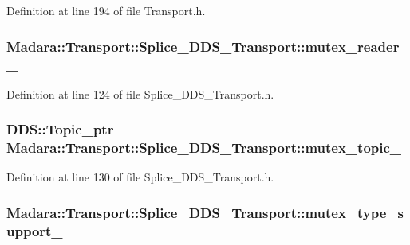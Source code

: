 Definition at line 194 of file Transport.h.

\hypertarget{classMadara_1_1Transport_1_1Splice__DDS__Transport_a977ec99be57aebd70c9ab6f9428144e0}{
\subsubsection[{mutex\_\-reader\_\-}]{ {\bf Madara::Transport::Splice\_\-DDS\_\-Transport::mutex\_\-reader\_\-}}}
\label{d0/d91/classMadara_1_1Transport_1_1Splice__DDS__Transport_a977ec99be57aebd70c9ab6f9428144e0}


Definition at line 124 of file Splice\_\-DDS\_\-Transport.h.

\hypertarget{classMadara_1_1Transport_1_1Splice__DDS__Transport_a6cb70c5b92c7849b09a9145b058ddb88}{
\subsubsection[{mutex\_\-topic\_\-}]{\setlength{\rightskip}{0pt plus 5cm}DDS::Topic\_\-ptr {\bf Madara::Transport::Splice\_\-DDS\_\-Transport::mutex\_\-topic\_\-}}}
\label{d0/d91/classMadara_1_1Transport_1_1Splice__DDS__Transport_a6cb70c5b92c7849b09a9145b058ddb88}


Definition at line 130 of file Splice\_\-DDS\_\-Transport.h.

\hypertarget{classMadara_1_1Transport_1_1Splice__DDS__Transport_ac61c1e33eb0a8c5f6a67f92ee583672b}{
\subsubsection[{mutex\_\-type\_\-support\_\-}]{ {\bf Madara::Transport::Splice\_\-DDS\_\-Transport::mutex\_\-type\_\-support\_\-}}}
\label{d0/d91/classMadara_1_1Transport_1_1Splice__DDS__Transport_ac61c1e33eb0a8c5f6a67f92ee583672b}


